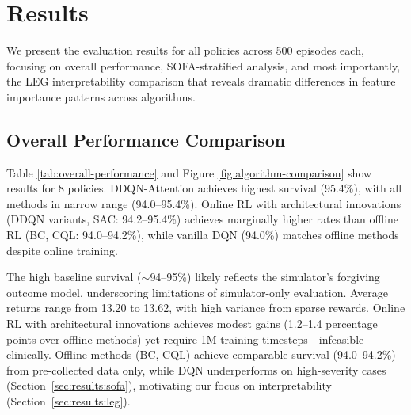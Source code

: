 
\section{Results}\label{sec:results}

We present the evaluation results for all policies across 500 episodes each, focusing on overall performance, SOFA-stratified analysis, and most importantly, the LEG interpretability comparison that reveals dramatic differences in feature importance patterns across algorithms.

\subsection{Overall Performance Comparison}\label{sec:results:overall}

Table \ref{tab:overall-performance} and Figure \ref{fig:algorithm-comparison} show results for 8 policies. DDQN-Attention achieves highest survival (95.4\%), with all methods in narrow range (94.0--95.4\%). Online RL with architectural innovations (DDQN variants, SAC: 94.2--95.4\%) achieves marginally higher rates than offline RL (BC, CQL: 94.0--94.2\%), while vanilla DQN (94.0\%) matches offline methods despite online training.

The high baseline survival ($\sim$94--95\%) likely reflects the simulator's forgiving outcome model, underscoring limitations of simulator-only evaluation. Average returns range from 13.20 to 13.62, with high variance from sparse rewards. Online RL with architectural innovations achieves modest gains (1.2--1.4 percentage points over offline methods) yet require 1M training timesteps—infeasible clinically. Offline methods (BC, CQL) achieve comparable survival (94.0--94.2\%) from pre-collected data only, while DQN underperforms on high-severity cases (Section~\ref{sec:results:sofa}), motivating our focus on interpretability (Section~\ref{sec:results:leg}).

